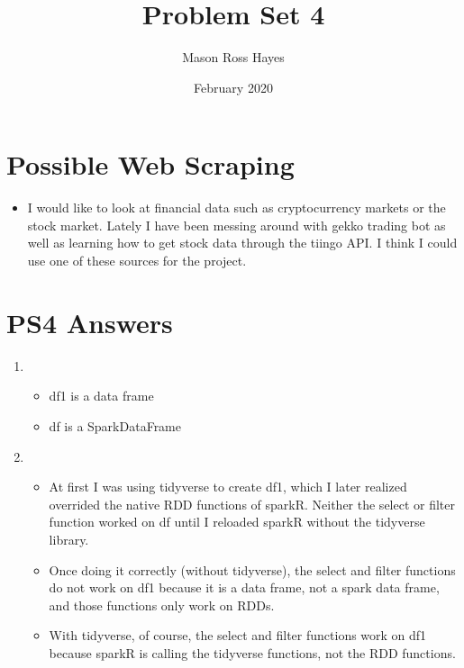 \documentclass{article}
\title{Problem Set 4}
\author{Mason Ross Hayes}
\date{February 2020}
\begin{document}
\maketitle

\section{Possible Web Scraping}

\begin{itemize}
    \item I would like to look at financial data such as cryptocurrency markets or the stock market. Lately I have been messing around with gekko trading bot as well as learning how to get stock data through the tiingo API. I think I could use one of these sources for the project.
\end{itemize}

\section{PS4 Answers}

\begin{enumerate}
    \item \begin{itemize}
        \item df1 is a data frame
        \item df is a SparkDataFrame
    \end{itemize}
    \item \begin{itemize}
        \item At first I was using tidyverse to create df1, which I later realized overrided the native RDD functions of sparkR. Neither the select or filter function worked on df until I reloaded sparkR without the tidyverse library.
        \item Once doing it correctly (without tidyverse), the select and filter functions do not work on df1 because it is a data frame, not a spark data frame, and those functions only work on RDDs.
        \item With tidyverse, of course, the select and filter functions work on df1 because sparkR is calling the tidyverse functions, not the RDD functions.
    \end{itemize}
\end{enumerate}
\end{document}
